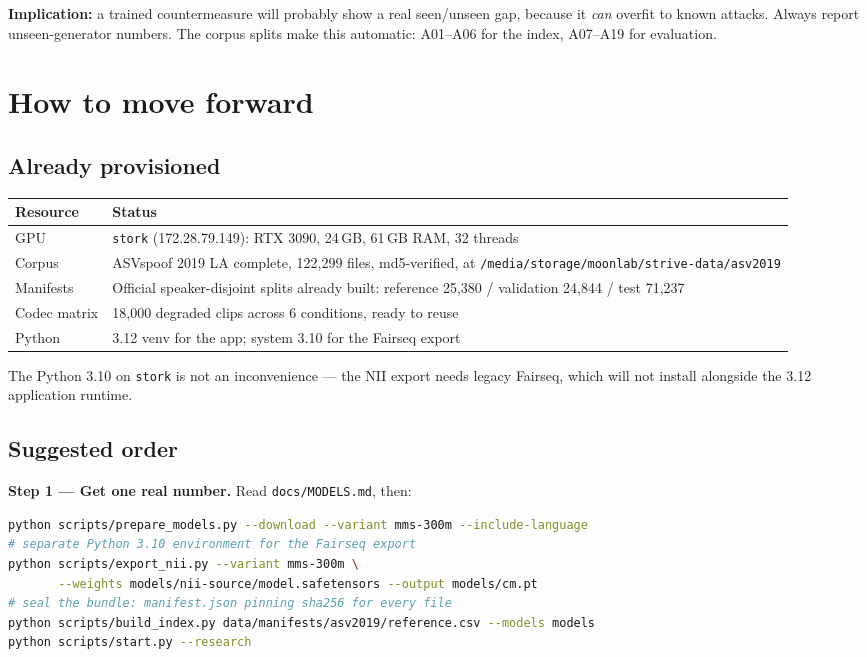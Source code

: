 \documentclass[11pt,a4paper]{article}
\newcommand{\code}[1]{\texttt{\small #1}}
\begin{document}
\textbf{Implication:} a trained countermeasure will probably show a real
seen/unseen gap, because it \emph{can} overfit to known attacks. Always report
unseen-generator numbers. The corpus splits make this automatic: A01--A06 for the
index, A07--A19 for evaluation.

\section{How to move forward}
\label{sec:next}

\subsection{Already provisioned}

\begin{center}
\begin{tabular}{@{}lp{9.6cm}@{}}
\toprule
\textbf{Resource} & \textbf{Status}\\
\midrule
GPU & \code{stork} (172.28.79.149): RTX 3090, 24\,GB, 61\,GB RAM, 32 threads\\
Corpus & ASVspoof 2019 LA complete, 122{,}299 files, md5-verified, at\newline
\code{/media/storage/moonlab/strive-data/asv2019}\\
Manifests & Official speaker-disjoint splits already built:\newline
reference 25{,}380 / validation 24{,}844 / test 71{,}237\\
Codec matrix & 18{,}000 degraded clips across 6 conditions, ready to reuse\\
Python & 3.12 venv for the app; system 3.10 for the Fairseq export\\
\bottomrule
\end{tabular}
\end{center}

The Python 3.10 on \code{stork} is not an inconvenience --- the NII export needs
legacy Fairseq, which will not install alongside the 3.12 application runtime.

\subsection{Suggested order}

\textbf{Step 1 --- Get one real number.} Read \code{docs/MODELS.md}, then:

\begin{lstlisting}[language=bash]
python scripts/prepare_models.py --download --variant mms-300m --include-language
# separate Python 3.10 environment for the Fairseq export
python scripts/export_nii.py --variant mms-300m \
       --weights models/nii-source/model.safetensors --output models/cm.pt
# seal the bundle: manifest.json pinning sha256 for every file
python scripts/build_index.py data/manifests/asv2019/reference.csv --models models
python scripts/start.py --research
\end{lstlisting}
\end{document}

